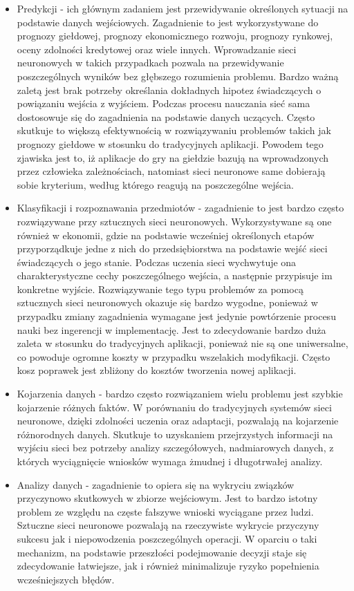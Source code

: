 \begin{itemize}
	\item Predykcji - ich głównym zadaniem jest przewidywanie określonych sytuacji na podstawie danych wejściowych. Zagadnienie to jest wykorzystywane do prognozy giełdowej, prognozy ekonomicznego rozwoju, prognozy rynkowej, oceny zdolności kredytowej oraz wiele innych. Wprowadzanie sieci neuronowych w takich przypadkach pozwala na przewidywanie poszczególnych wyników bez głębszego rozumienia problemu. Bardzo ważną zaletą jest brak potrzeby określania dokładnych hipotez świadczących o powiązaniu wejścia z wyjściem. Podczas procesu nauczania sieć sama dostosowuje się do zagadnienia na podstawie danych uczących. Często skutkuje to większą efektywnością w rozwiązywaniu problemów takich jak prognozy giełdowe w stosunku do tradycyjnych aplikacji. Powodem tego zjawiska jest to, iż aplikacje do gry na giełdzie bazują na wprowadzonych przez człowieka zależnościach, natomiast sieci neuronowe same dobierają sobie kryterium, według którego reagują na poszczególne wejścia.
	\item Klasyfikacji i rozpoznawania przedmiotów - zagadnienie to jest bardzo często rozwiązywane przy sztucznych sieci neuronowych. Wykorzystywane są one również w ekonomii, gdzie na podstawie wcześniej określonych etapów przyporządkuje jedne z nich do przedsiębiorstwa na podstawie wejść sieci świadczących o jego stanie. Podczas uczenia sieci wychwytuje ona charakterystyczne cechy poszczególnego wejścia, a następnie przypisuje im konkretne wyjście. Rozwiązywanie tego typu problemów za pomocą sztucznych sieci neuronowych okazuje się bardzo wygodne, ponieważ w przypadku zmiany zagadnienia wymagane jest jedynie powtórzenie procesu nauki bez ingerencji w implementację. Jest to zdecydowanie bardzo duża zaleta w stosunku do tradycyjnych aplikacji, ponieważ nie są one uniwersalne, co powoduje ogromne koszty w przypadku wszelakich modyfikacji. Często kosz poprawek jest zbliżony do kosztów tworzenia nowej aplikacji.
	\item Kojarzenia danych - bardzo często rozwiązaniem wielu problemu jest szybkie kojarzenie różnych faktów. W porównaniu do tradycyjnych systemów sieci neuronowe, dzięki zdolności uczenia oraz adaptacji, pozwalają na kojarzenie różnorodnych danych.  Skutkuje to uzyskaniem przejrzystych informacji na wyjściu sieci bez potrzeby analizy szczegółowych, nadmiarowych danych, z których wyciągnięcie wniosków wymaga żmudnej i długotrwałej analizy. 
	\item Analizy danych - zagadnienie to opiera się na wykryciu związków przyczynowo skutkowych w zbiorze wejściowym. Jest to bardzo istotny problem ze względu na częste fałszywe wnioski wyciągane przez ludzi. Sztuczne sieci neuronowe pozwalają na rzeczywiste wykrycie przyczyny sukcesu jak i niepowodzenia poszczególnych operacji. W oparciu o taki mechanizm, na podstawie przeszłości podejmowanie decyzji staje się zdecydowanie łatwiejsze, jak i również minimalizuje ryzyko popełnienia wcześniejszych błędów.

\end{itemize}
